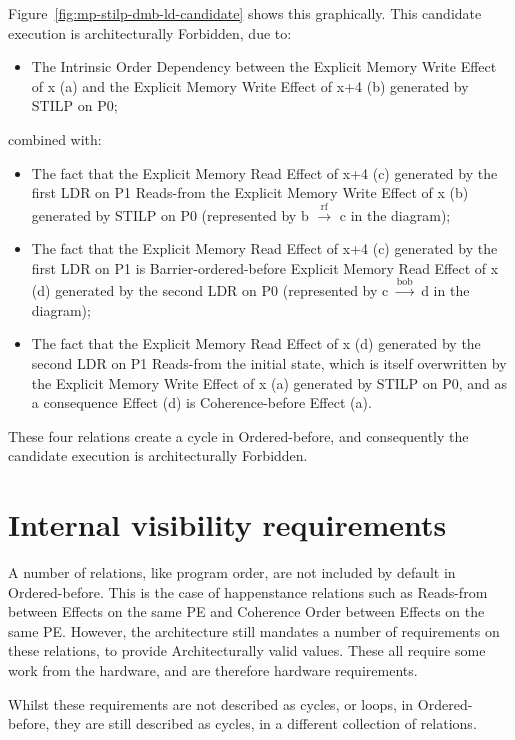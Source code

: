 \documentclass{book}
\begin{document}
Figure~\ref{fig:mp-stilp-dmb-ld-candidate} shows this graphically.
%
This candidate execution is architecturally Forbidden, due to:
\begin{itemize}
\item The Intrinsic Order Dependency between the Explicit Memory Write Effect
  of x (a) and the Explicit Memory Write Effect of x+4 (b) generated by STILP on P0;
\end{itemize}
combined with:
\begin{itemize}
\item The fact that the Explicit Memory Read Effect
of x+4 (c) generated by the first LDR on P1 Reads-from the
Explicit Memory Write Effect of x (b) generated by
STILP on P0 (represented by b $\xrightarrow{\text{rf}}$ c in the
diagram);
\item The fact that the Explicit Memory Read Effect
of x+4 (c) generated by the first LDR on P1 is Barrier-ordered-before
Explicit Memory Read Effect of x (d) generated by
the second LDR on P0 (represented by c $\xrightarrow{\text{bob}}$ d in the
diagram);
\item The fact that the Explicit Memory Read Effect
of x (d) generated by the second LDR on P1 Reads-from the
initial state, which is itself overwritten by the
Explicit Memory Write Effect of x (a) generated by
STILP on P0, and as a consequence Effect (d) is
Coherence-before Effect (a).
\end{itemize}

These four relations create a cycle in
Ordered-before, and consequently the candidate
execution is architecturally Forbidden. 

\section{Internal visibility requirements \label{sec:internal-visibility-reqs}}

A number of relations, like program order, are not
included by default in Ordered-before. This is the
case of happenstance relations such as Reads-from
between Effects on the same PE and Coherence Order
between Effects on the same PE.
%
However, the architecture still mandates a number of requirements on these
relations, to provide Architecturally valid values. These all require some work
from the hardware, and are therefore hardware requirements.    

Whilst these requirements are not described as cycles, or loops, in
Ordered-before, they are still described as cycles, in a different collection
of relations.
\end{document}
